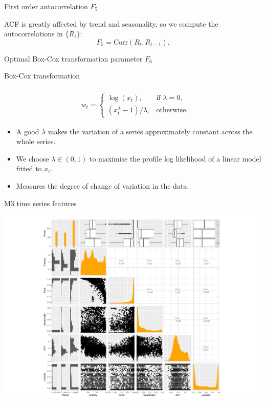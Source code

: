 \documentclass[12pt,ignorenonframetext,compress]{beamer}
\begin{document}
\begin{frame}{First order autocorrelation \(F_5\)}

ACF is greatly affected by trend and seasonality, so we compute the
autocorrelations in \(\{R_t\}\): \[
F_5 = \text{Corr}(R_t,R_{t-1}).
\]

\end{frame}

\begin{frame}{Optimal Box-Cox transformation parameter \(F_6\)}

\begin{block}{Box-Cox transformation}

\[
\begin{aligned}
& \\
&    w_t=
    \begin{cases}
      \log(x_t),               & \text{if }\lambda = 0, \\
      (x_t^\lambda-1)/\lambda, & \text{otherwise}.
    \end{cases}
\end{aligned}
\]

\begin{itemize}
\item
  A good \(\lambda\) makes the variation of a series approximately
  constant across the whole series.
\item
  We choose \(\lambda \in (0, 1)\) to maximise the profile log
  likelihood of a linear model fitted to \(x_t\).
\item
  Measures the degree of change of variation in the data.
\end{itemize}

\end{block}

\end{frame}

\begin{frame}{M3 time series features}

\centerline{\includegraphics[width=\textwidth]{figures/PairwisePlot.pdf}}

\end{frame}
\end{document}
